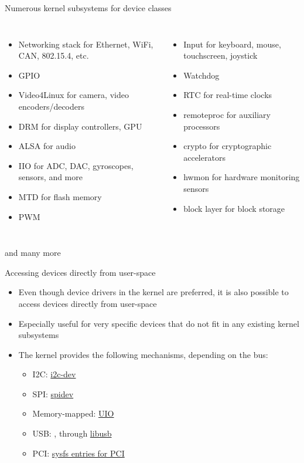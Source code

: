 \begin{frame}{Numerous kernel subsystems for device classes}
  \begin{columns}
    \begin{itemize}
    \item Networking stack for Ethernet, WiFi, CAN, 802.15.4, etc.
    \item GPIO
    \item Video4Linux for camera, video encoders/decoders
    \item DRM for display controllers, GPU
    \item ALSA for audio
    \item IIO for ADC, DAC, gyroscopes, sensors, and more
    \item MTD for flash memory
    \item PWM
    \end{itemize}
    \begin{itemize}
    \item Input for keyboard, mouse, touchscreen, joystick
    \item Watchdog
    \item RTC for real-time clocks
    \item remoteproc for auxiliary processors
    \item crypto for cryptographic accelerators
    \item hwmon for hardware monitoring sensors
    \item block layer for block storage
    \end{itemize}
  \end{columns}
  \begin{center}
    and many more
  \end{center}
\end{frame}

\begin{frame}{Accessing devices directly from user-space}
  \begin{itemize}
  \item Even though device drivers in the kernel are preferred, it is
    also possible to access devices directly from user-space
  \item Especially useful for very specific devices that do not fit in
    any existing kernel subsystems
  \item The kernel provides the following mechanisms, depending on the
    bus:
    \begin{itemize}
    \item I2C: \href{https://docs.kernel.org/i2c/dev-interface.html}{i2c-dev}
    \item SPI: \href{https://docs.kernel.org/spi/spidev.html}{spidev}
    \item Memory-mapped: \href{https://docs.kernel.org/driver-api/uio-howto.html}{UIO}
    \item USB: , through \href{https://libusb.info/}{libusb}
    \item PCI: \href{https://docs.kernel.org/PCI/sysfs-pci.html}{sysfs entries for PCI}
    \end{itemize}
  \end{itemize}
\end{frame}

